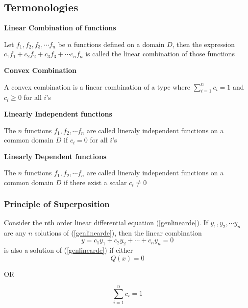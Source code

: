 \documentclass[a4paper, titlepage]{article}
\begin{document}
        \subsection{Termonologies}
            \begin{description}
                \item \textbf{Linear Combination of functions}
                
                Let $f_1, f_2, f_3, \cdots f_n$ be $n$ functions defined
                on a domain $D$, then the expression $c_1f_1 + c_2f_2 +
                c_3f_3 + \cdots c_nf_n$ is called the linear combination
                of those functions

                \item \textbf{Convex Combination}
                
                A convex combination is a linear combination of a type
                where $\displaystyle\sum_{i=1}^n c_i = 1$ and $c_i \ge 0$
                for all $i$'s

                \item \textbf{Linearly Independent functions}
                
                The $n$ functions $f_1, f_2, \cdots f_n$ are called lineraly
                independent functions on a common domain $D$ if $c_i = 0$ 
                for all $i$'s

                \item \textbf{Linearly Dependent functions}
                
                The $n$ functions $f_1, f_2, \cdots f_n$ are called lineraly
                independent functions on a common domain $D$ if there 
                exist a scalar $c_i \neq 0$
            \end{description}

            \subsubsection{Principle of Superposition}
            Consider the nth order linear differential equation 
            (\ref{genlinearde}). If $y_1, y_2, \cdots y_n$ are any
            $n$ solutions of (\ref{genlinearde}), then the linear
            combination \[y = c_1y_1 + c_2y_2 + \cdots + c_ny_n = 0 \]
            is also a solution of (\ref{genlinearde}) if either \[
            Q(x) = 0 \]
            \begin{center}
                OR
            \end{center}
            \[ \displaystyle\sum_{i=1}^n c_i = 1 \]
\end{document}
